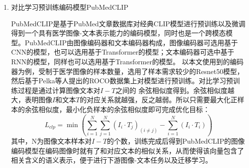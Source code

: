 \begin{enumerate}[topsep = 0 pt, itemsep= 0 pt, parsep=0pt, partopsep=0pt, leftmargin=0pt, itemindent=44pt, labelsep=6pt, listparindent=22pt, label=(\arabic*)]
	\item 对比学习预训练编码模型PubMedCLIP
	
	PubMedCLIP是基于PubMed文章数据库对经典CLIP模型进行预训练以及微调得到一个具有医学图像-文本表示能力的编码模型，同时也是一个跨模态模型。PubMedCLIP由图像编码器和文本编码器构成，图像编码器可选用基于CNN的模型，也可以选用基于Transformer的模型；文本编码器可选中基于RNN的模型，同样也可以选用基于Transformer的模型。
	以本文使用到的编码器为例，受制于医学图像的样本数量，选用了样本需求较少的Resnet50模型，然后基于Pelka等人提出的ROCO数据集上对模型进行预训练。对比学习预训练过程是通过计算图像文本对$I-T$之间的
	余弦相似度得到。余弦相似度越大，表明图像$I$和文本$T$的对应关系就越强，反之越弱。所以只需要最大化正样本的余弦相似度，最小化负样本的余弦相似度即可完成优化目标：
	\begin{equation}
		\label{}
		L_{clp}=\min \left(\sum_{i=1}^N \sum_{j=1}^N\left(I_i \cdot T_j\right)_{(i \neq j)}-\sum_{i=1}^N\left(I_i \cdot T_i\right)\right)
	\end{equation}
	其中，N为图像文本样本对$I-T$的个数，训练完成后得到PubMedCLIP的图像编码模型在编码图像时就有了和对应文本的相似关系，从而使得该向量包含了相关含义的语义表示，便于进行下游图像-文本任务以及迁移学习。
\end{enumerate}

